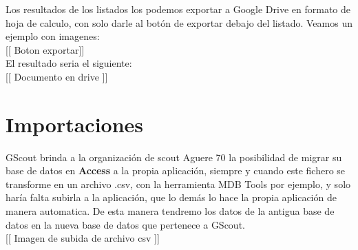 Los resultados de los listados los podemos exportar a Google Drive en formato de hoja de calculo, con solo darle al botón de exportar debajo del listado. Veamos un ejemplo con imagenes:\\

[[ Boton exportar]]\\

El resultado seria el siguiente:\\

[[ Documento en drive ]]

\section{Importaciones}
\label{3:sec7}

GScout brinda a la organización de scout Aguere 70 la posibilidad de migrar su base de datos en \textbf{Access} a la propia aplicación, siempre y cuando este fichero se transforme en un archivo .csv, con la herramienta MDB Tools por ejemplo,
y solo haría falta subirla a la aplicación, que lo demás lo hace la propia aplicación de manera automatica. De esta manera tendremo los datos de la antigua base de datos en la nueva base de datos que pertenece a GScout.\\


[[ Imagen de subida de archivo csv ]]
